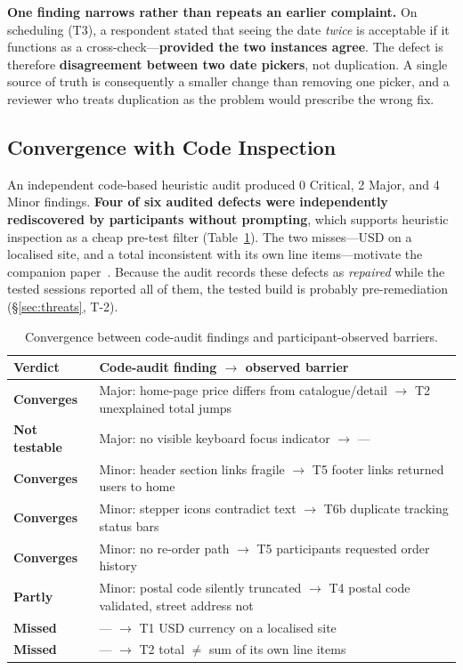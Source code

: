 \documentclass[conference]{IEEEtran}
\begin{document}
\textbf{One finding narrows rather than repeats an earlier complaint.} On
scheduling (T3), a respondent stated that seeing the date \emph{twice} is
acceptable if it functions as a cross-check---\textbf{provided the two
instances agree}. The defect is therefore \textbf{disagreement between two
date pickers}, not duplication. A single source of truth is consequently a
smaller change than removing one picker, and a reviewer who treats
duplication as the problem would prescribe the wrong fix.

\subsection{Convergence with Code Inspection}
\label{sec:convergence}

An independent code-based heuristic audit produced 0 Critical, 2 Major, and
4 Minor findings. \textbf{Four of six audited defects were independently
rediscovered by participants without prompting}, which supports heuristic
inspection as a cheap pre-test filter (Table~\ref{tab:convergence}). The
two misses---USD on a localised site, and a total inconsistent with its
own line items---motivate the companion paper~\cite{braniwati}. Because
the audit records these defects as \emph{repaired} while the tested
sessions reported all of them, the tested build is probably
pre-remediation (\S\ref{sec:threats}, T-2).

\begin{table}[!t]
\caption{Convergence between code-audit findings and participant-observed
barriers.}
\label{tab:convergence}
\centering
\scriptsize
\begin{tabular}{@{}>{\raggedright\arraybackslash}p{1.5cm}>{\raggedright\arraybackslash}p{6.6cm}@{}}
\toprule
\textbf{Verdict} & \textbf{Code-audit finding $\rightarrow$ observed barrier} \\
\midrule
\textbf{Converges} & Major: home-page price differs from catalogue/detail
  $\rightarrow$ T2 unexplained total jumps \\
\textbf{Not testable} & Major: no visible keyboard focus indicator
  $\rightarrow$ --- \\
\textbf{Converges} & Minor: header section links fragile $\rightarrow$ T5
  footer links returned users to home \\
\textbf{Converges} & Minor: stepper icons contradict text $\rightarrow$ T6b
  duplicate tracking status bars \\
\textbf{Converges} & Minor: no re-order path $\rightarrow$ T5 participants
  requested order history \\
\textbf{Partly} & Minor: postal code silently truncated $\rightarrow$ T4
  postal code validated, street address not \\
\textbf{Missed} & --- $\rightarrow$ T1 USD currency on a localised site \\
\textbf{Missed} & --- $\rightarrow$ T2 total $\neq$ sum of its own line
  items \\
\bottomrule
\end{tabular}
\end{table}
\end{document}
